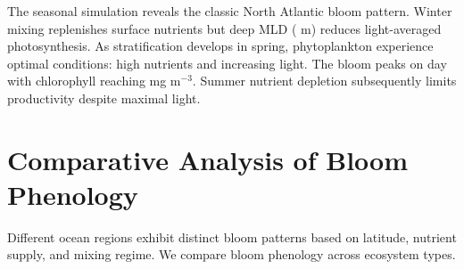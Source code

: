 \documentclass[a4paper, 11pt]{article}
\begin{document}
The seasonal simulation reveals the classic North Atlantic bloom pattern. Winter mixing replenishes
surface nutrients but deep MLD ( m) reduces light-averaged photosynthesis.
As stratification develops in spring, phytoplankton experience optimal conditions: high nutrients
and increasing light. The bloom peaks on day  with chlorophyll
reaching  mg m$^{-3}$. Summer nutrient depletion subsequently
limits productivity despite maximal light.

\section{Comparative Analysis of Bloom Phenology}

Different ocean regions exhibit distinct bloom patterns based on latitude, nutrient supply, and
mixing regime. We compare bloom phenology across ecosystem types.
\end{document}
